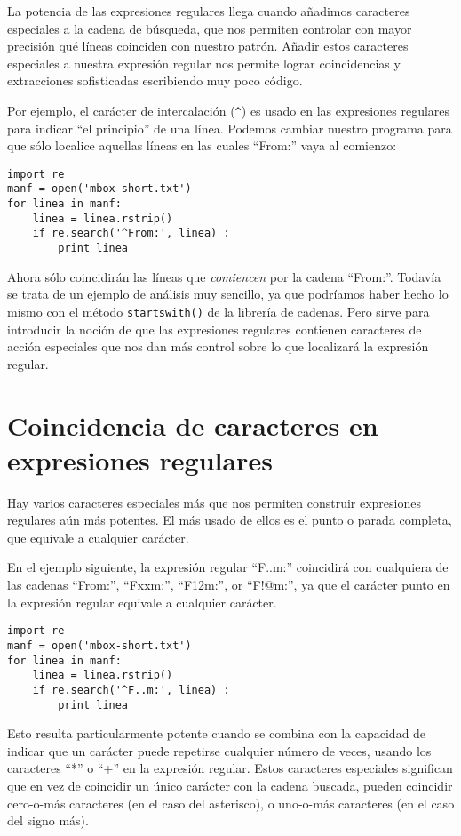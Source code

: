 La potencia de las expresiones regulares llega cuando añadimos caracteres especiales a la cadena de
búsqueda, que nos permiten controlar con mayor precisión qué líneas coinciden con nuestro patrón.
Añadir estos caracteres especiales a nuestra expresión regular nos permite lograr coincidencias y
extracciones sofisticadas escribiendo muy poco código.

Por ejemplo, el carácter de intercalación (\verb"^") es usado en las expresiones
regulares para indicar ``el principio'' de una línea.
Podemos cambiar nuestro programa para que sólo localice
aquellas líneas en las cuales ``From:'' vaya al comienzo:

\beforeverb
\begin{verbatim}
import re
manf = open('mbox-short.txt')
for linea in manf:
    linea = linea.rstrip()
    if re.search('^From:', linea) :
        print linea
\end{verbatim}
\afterverb
%
Ahora sólo coincidirán las líneas que {\em comiencen} por la cadena ``From:''. Todavía se trata
de un ejemplo de análisis muy sencillo, ya que podríamos haber hecho lo mismo con el método
{\tt startswith()} de la librería de cadenas. Pero sirve para introducir la noción de que las expresiones
regulares contienen caracteres de acción especiales que nos dan más control sobre lo que localizará
la expresión regular.

\section{Coincidencia de caracteres en expresiones regulares}

Hay varios caracteres especiales más que nos permiten construir expresiones regulares aún más potentes.
El más usado de ellos es el punto o parada completa, que equivale
a cualquier carácter.

En el ejemplo siguiente, la expresión regular ``F..m:'' coincidirá con cualquiera de las cadenas
``From:'', ``Fxxm:'', ``F12m:'', or ``F!@m:'', ya que el carácter punto en la expresión regular
equivale a cualquier carácter.

\beforeverb
\begin{verbatim}
import re
manf = open('mbox-short.txt')
for linea in manf:
    linea = linea.rstrip()
    if re.search('^F..m:', linea) :
        print linea
\end{verbatim}
\afterverb
%
Esto resulta particularmente potente cuando se combina con la capacidad de indicar que un carácter
puede repetirse cualquier número de veces, usando los caracteres ``*'' o ``+'' en la expresión regular.
Estos caracteres especiales significan que en vez de coincidir un único carácter con la cadena buscada,
pueden coincidir cero-o-más caracteres (en el caso del asterisco), o uno-o-más caracteres
(en el caso del signo más).


